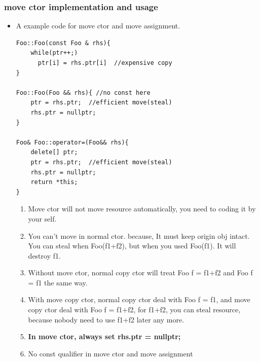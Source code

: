 \documentclass[a4paper,11pt,twoside]{book}
\begin{document}
\subsubsection{move ctor implementation and usage}
\begin{itemize}
	\item A example code for move ctor and move assignment.	
\begin{lstlisting}[numbers=none]
Foo::Foo(const Foo & rhs){
	while(ptr++;)
	  ptr[i] = rhs.ptr[i]  //expensive copy
}

Foo::Foo(Foo && rhs){ //no const here
	ptr = rhs.ptr;  //efficient move(steal)
	rhs.ptr = nullptr;
}

Foo& Foo::operator=(Foo&& rhs){
	delete[] ptr;
	ptr = rhs.ptr;  //efficient move(steal)
	rhs.ptr = nullptr;
	return *this;
}
\end{lstlisting}
	

	
	\begin{enumerate}
		\item Move ctor will not move resource automatically, you need to coding it by your self.
		
		\item You can't move in normal ctor. because, It must keep origin obj intact.  You can steal when Foo(f1+f2), but when you used Foo(f1).  It will destroy f1.
		
		\item Without  move ctor, normal copy ctor will treat Foo f = f1+f2 and Foo f = f1 the same way.
		
		\item With move copy ctor, normal copy ctor deal with Foo f = f1, and move copy ctor deal with Foo f = f1+f2, for f1+f2, you can steal resource, because nobody need to use f1+f2 later any more.
		
		\item \textbf{In move ctor, always set rhs.ptr = nullptr;}
		
		\item No const qualifier in move ctor and move assignment
		
	\end{enumerate}
	

\end{itemize}
\end{document}
